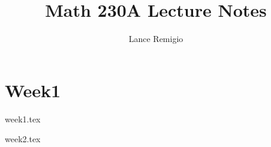 \documentclass[a4paper]{report}
\title{Math 230A Lecture Notes}
\author{Lance Remigio}
\begin{document}
\maketitle 
\tableofcontents

\chapter{Week1}

{week1.tex}

{week2.tex}
\end{document}
